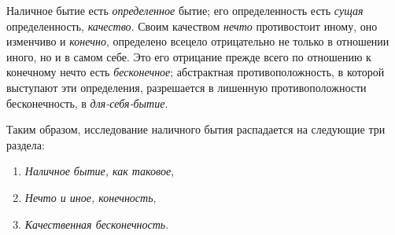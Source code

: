 Наличное бытие есть \emph{определенное} бытие; его определенность
есть \emph{сущая} определенность, \emph{качество}. Своим
качеством \emph{нечто} противостоит иному, оно изменчиво\endnotemark{}
и \emph{конечно}, определено всецело отрицательно не только в
отношении иного, но и в самом себе. Это его отрицание
прежде всего по отношению к конечному нечто есть \emph{бесконечное};
абстрактная противоположность, в которой выступают
эти определения, разрешается в лишенную противоположности
бесконечность, в \emph{для-себя-бытие}.


Таким образом, исследование наличного бытия распадается
на следующие три раздела:

\begin{enumerate}[label=\Alph*)]
\item \emph{Наличное бытие, как таковое},
\item \emph{Нечто и иное, конечность},
\item \emph{Качественная бесконечность}.
\end{enumerate}


